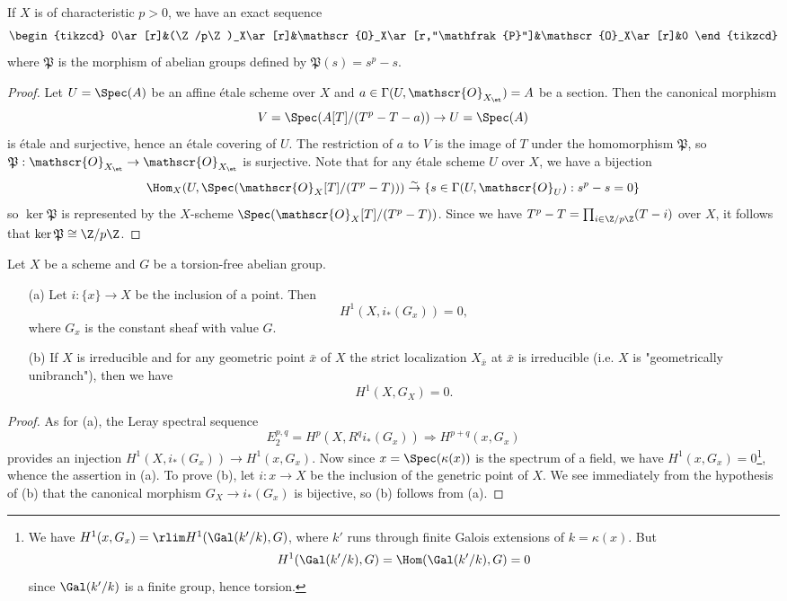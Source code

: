 \begin{theorem}\label{scheme etale Artin-Schreier exact sequence}
If $X$ is of characteristic $p>0$, we have an exact sequence
\[\begin{tikzcd}
0\ar[r]&(\Z/p\Z)_X\ar[r]&\mathscr{O}_X\ar[r,"\mathfrak{P}"]&\mathscr{O}_X\ar[r]&0
\end{tikzcd}\]
where $\mathfrak{P}$ is the morphism of abelian groups defined by $\mathfrak{P}(s)=s^p-s$.
\end{theorem}
\begin{proof}
Let $U=\Spec(A)$ be an affine \'etale scheme over $X$ and $a\in\Gamma(U,\mathscr{O}_{X_\et})=A$ be a section. Then the canonical morphism
\[V=\Spec(A[T]/(T^p-T-a))\to U=\Spec(A)\]
is \'etale and surjective, hence an \'etale covering of $U$. The restriction of $a$ to $V$ is the image of $T$ under the homomorphism $\mathfrak{P}$, so $\mathfrak{P}:\mathscr{O}_{X_\et}\to\mathscr{O}_{X_\et}$ is surjective. Note that for any \'etale scheme $U$ over $X$, we have a bijection
\[\Hom_X(U,\Spec(\mathscr{O}_X[T]/(T^p-T)))\stackrel{\sim}{\to} \{s\in\Gamma(U,\mathscr{O}_U):s^p-s=0\}\]
so $\ker\mathfrak{P}$ is represented by the $X$-scheme $\Spec(\mathscr{O}_X[T]/(T^p-T))$. Since we have $T^p-T=\prod_{i\in\Z/p\Z}(T-i)$ over $X$, it follows that $\ker\mathfrak{P}\cong\Z/p\Z$.
\end{proof}

\begin{proposition}\label{scheme etale cohomology of torsion-free at point}
Let $X$ be a scheme and $G$ be a torsion-free abelian group.
\begin{enumerate}
    \item[(a)] Let $i:\{x\}\to X$ be the inclusion of a point. Then
    \[H^1(X,i_*(G_x))=0,\]
    where $G_x$ is the constant sheaf with value $G$.
    \item[(b)] If $X$ is irreducible and for any geometric point $\bar{x}$ of $X$ the strict localization $X_{\bar{x}}$ at $\bar{x}$ is irreducible (i.e. $X$ is "geometrically unibranch"), then we have
    \[H^1(X,G_X)=0.\] 
\end{enumerate}
\end{proposition}
\begin{proof}
As for (a), the Leray spectral sequence
\[E_2^{p,q}=H^p(X,R^qi_*(G_x))\Rightarrow H^{p+q}(x,G_x)\]
provides an injection $H^1(X,i_*(G_x))\to H^1(x,G_x)$. Now since $x=\Spec(\kappa(x))$ is the spectrum of a field, we have $H^1(x,G_x)=0$\footnote{We have $H^1(x,G_x)=\rlim H^1(\Gal(k'/k),G)$, where $k'$ runs through finite Galois extensions of $k=\kappa(x)$. But
\[H^1(\Gal(k'/k),G)=\Hom(\Gal(k'/k),G)=0\]
since $\Gal(k'/k)$ is a finite group, hence torsion.}, whence the assertion in (a). To prove (b), let $i:x\to X$ be the inclusion of the genetric point of $X$. We see immediately from the hypothesis of (b) that the canonical morphism $G_X\to i_*(G_x)$ is bijective, so (b) follows from (a).
\end{proof}

